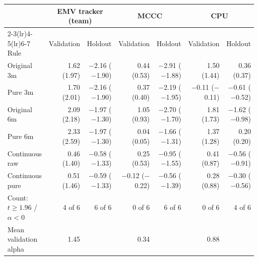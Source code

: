 \begin{tabular}{@{}l*{6}{r}@{}}
\toprule
 & \multicolumn{2}{c}{EMV tracker (team)} & \multicolumn{2}{c}{MCCC} & \multicolumn{2}{c}{CPU} \\
\cmidrule(lr){2-3}\cmidrule(lr){4-5}\cmidrule(lr){6-7}
Rule & Validation & Holdout & Validation & Holdout & Validation & Holdout \\
\midrule
Original 3m & 1.62 (1.97) & $-$2.16 ($-$1.90) & 0.44 (0.53) & $-$2.91 ($-$1.88) & 1.50 (1.44) & 0.36 (0.37) \\
Pure 3m & 1.70 (2.01) & $-$2.16 ($-$1.90) & 0.37 (0.40) & $-$2.19 ($-$1.95) & $-$0.11 ($-$0.11) & $-$0.61 ($-$0.52) \\
Original 6m & 2.09 (2.18) & $-$1.97 ($-$1.30) & 1.05 (0.93) & $-$2.70 ($-$1.70) & 1.81 (1.73) & $-$1.62 ($-$0.98) \\
Pure 6m & 2.33 (2.59) & $-$1.97 ($-$1.30) & 0.04 (0.05) & $-$1.66 ($-$1.31) & 1.37 (1.28) & 0.20 (0.20) \\
Continuous raw & 0.46 (1.40) & $-$0.58 ($-$1.33) & 0.25 (0.53) & $-$0.95 ($-$1.55) & 0.41 (0.87) & $-$0.56 ($-$0.91) \\
Continuous pure & 0.51 (1.46) & $-$0.59 ($-$1.33) & $-$0.12 ($-$0.22) & $-$0.56 ($-$1.39) & 0.28 (0.88) & $-$0.30 ($-$0.56) \\
\midrule
Count: $t\ge1.96$ / $\alpha<0$ & 4 of 6 & 6 of 6 & 0 of 6 & 6 of 6 & 0 of 6 & 4 of 6 \\
Mean validation alpha & 1.45 &  & 0.34 &  & 0.88 &  \\
\bottomrule
\end{tabular}
